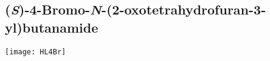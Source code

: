 {{{{{{{{{{{{{{{%
%

\subsection{(\textit{S})-4-Bromo-\textit{N}-(2-oxotetrahydrofuran-3-yl)butanamide }


\begin{scheme}[H]
	\begin{center}
		\texttt{[image: HL4Br]}
	\end{center}
\end{scheme}

}}}}}}}}}}}}}}}
